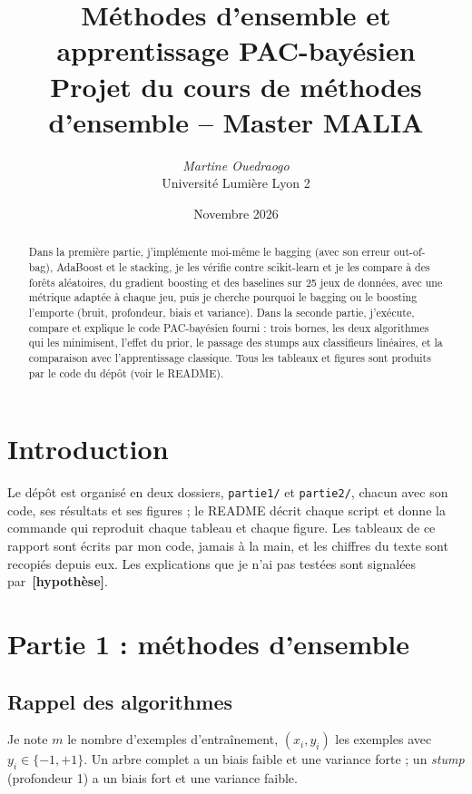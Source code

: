 \documentclass[11pt,a4paper]{article}
\title{\textbf{Méthodes d'ensemble et apprentissage PAC-bayésien}\\[2pt]\large Projet du cours de méthodes d'ensemble -- Master MALIA}
\author{\textit{Martine Ouedraogo}\\ Université Lumière Lyon 2}
\date{Novembre 2026}
\newcommand{\hyp}{\textbf{[hypothèse]}}
\begin{document}
\maketitle

\begin{abstract}
\noindent Dans la première partie, j'implémente moi-même le bagging (avec son erreur out-of-bag), AdaBoost et le stacking, je les vérifie contre
scikit-learn et je les compare à des forêts aléatoires, du gradient boosting et des baselines sur 25 jeux de données, avec une métrique adaptée
à chaque jeu, puis je cherche pourquoi le bagging ou le boosting l'emporte (bruit, profondeur, biais et variance). Dans la seconde partie, j'exécute,
compare et explique le code PAC-bayésien fourni : trois bornes, les deux algorithmes qui les minimisent, l'effet du prior, le passage des stumps aux classifieurs
linéaires, et la comparaison avec l'apprentissage classique. Tous les tableaux et figures sont produits par le code du dépôt (voir le README).
\end{abstract}

\section{Introduction}
Le dépôt est organisé en deux dossiers, \texttt{partie1/} et \texttt{partie2/}, chacun avec son code, ses résultats et ses figures ; le README décrit chaque
script et donne la commande qui reproduit chaque tableau et chaque figure. Les tableaux de ce rapport sont écrits par mon code, jamais à la main, et les
chiffres du texte sont recopiés depuis eux. Les explications que je n'ai pas testées sont signalées par~\hyp.

\section{Partie 1 : méthodes d'ensemble}
\subsection{Rappel des algorithmes}
Je note $m$ le nombre d'exemples d'entraînement, $(x_i,y_i)$ les exemples avec $y_i\in\{-1,+1\}$. Un arbre complet a un biais faible et une variance forte ; un
\emph{stump} (profondeur 1) a un biais fort et une variance faible.
\end{document}

